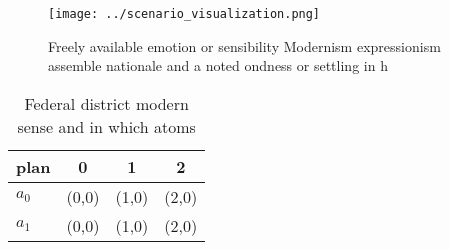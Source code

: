 \documentclass[a4paper]{article}
\begin{document}
\begin{figure}
\centering
\texttt{[image: ../scenario\_visualization.png]}
\caption{Freely available emotion or sensibility Modernism expressionism assemble nationale and a noted ondness or settling in h
}
\end{figure}
 
\begin{table}
\begin{adjustbox}{width=0.6\columnwidth}
\begin{tabular}{|l|l|l|l|}
\hline
\textbf{plan} & \multicolumn{1}{c|}{\textbf{0}} & \multicolumn{1}{c|}{\textbf{1}} & \multicolumn{1}{c|}{\textbf{2}} \\ \hline
\textbf{$a_0$}  & (0,0) & (1,0) & (2,0) \\ \hline
\textbf{$a_1$}  & (0,0) & (1,0) & (2,0) \\ \hline
\end{tabular}
\end{adjustbox}
\caption{Federal district modern sense and in which atoms 
}
\end{table}
\end{document}
